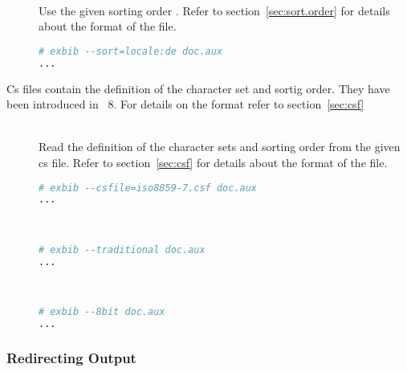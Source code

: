 \begin{description}
\item[ ]
\item[ ]\ \\
  Use the given sorting order . Refer to section~\ref{sec:sort.order} for
  details about the format of the file.

\begin{lstlisting}[language=sh]
# exbib --sort=locale:de doc.aux
...
\end{lstlisting}

\end{description}


Cs files contain the definition of the character set and sortig
order. They have been introduced in \BibTeX~8.
For details on the format refer to section~\ref{sec:csf}

\begin{description}
\item[ ]\ \\
  Read the definition of the character sets and sorting order from the
  given cs file. Refer to section~\ref{sec:csf} for details about the
  format of the file.
\begin{lstlisting}[language=sh]
# exbib --csfile=iso8859-7.csf doc.aux
...
\end{lstlisting}

\ifdraft\else
\item[]
\item[]\ \\
  \INCOMPLETE
\begin{lstlisting}[language=sh]
# exbib --traditional doc.aux
...
\end{lstlisting}
\fi

\ifdraft\else
\item[]
\item[]\ \\
  \INCOMPLETE
\begin{lstlisting}[language=sh]
# exbib --8bit doc.aux
...
\end{lstlisting}
\fi

\end{description}

\subsubsection{Redirecting Output}


